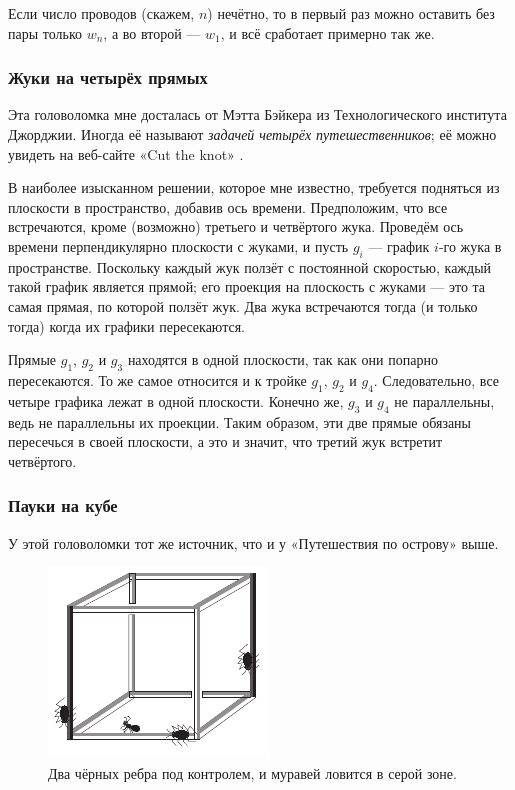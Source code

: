 Если число проводов (скажем, $n$) нечётно, то в первый раз можно оставить без пары только $w_n$, а во второй --- $w_1$, и всё сработает примерно так же.

\subsubsection*{Жуки на четырёх прямых}

Эта головоломка мне досталась от Мэтта Бэйкера из Технологического института Джорджии.
Иногда её называют \emph{задачей четырёх путешественников};
её можно увидеть на веб-сайте «Cut the knot» \cite{cut-the-knot}.

В наиболее изысканном решении, которое мне известно, требуется подняться из плоскости в пространство, добавив ось времени.
Предположим, что все встречаются, кроме (возможно) третьего и четвёртого жука.
Проведём ось времени перпендикулярно плоскости с жуками, и пусть $g_i$ --- график $i$-го жука в пространстве.
Поскольку каждый жук ползёт с постоянной скоростью, каждый такой график является прямой;
его проекция на плоскость с жуками --- это та самая прямая, по которой ползёт жук.
Два жука встречаются тогда (и только тогда) когда их графики пересекаются.

Прямые $g_1$, $g_2$ и $g_3$ находятся в одной плоскости, так как они попарно пересекаются.
То же самое относится и к тройке  $g_1$, $g_2$ и $g_4$.
Следовательно, все четыре графика лежат в одной плоскости.
Конечно же, $g_3$ и $g_4$ не параллельны, ведь не параллельны их проекции.
Таким образом, эти две прямые обязаны пересечься в своей плоскости,
а это и значит, что третий жук встретит четвёртого.

\subsubsection*{Пауки на кубе}

У этой головоломки тот же источник, что и у «Путешествия по острову» выше.

\begin{figure}[ht!]
\centering
\includegraphics[scale=1]{pics/cube}
\caption{Два чёрных ребра под контролем, и муравей ловится в серой зоне.}
\label{pic:cube}
\end{figure}

